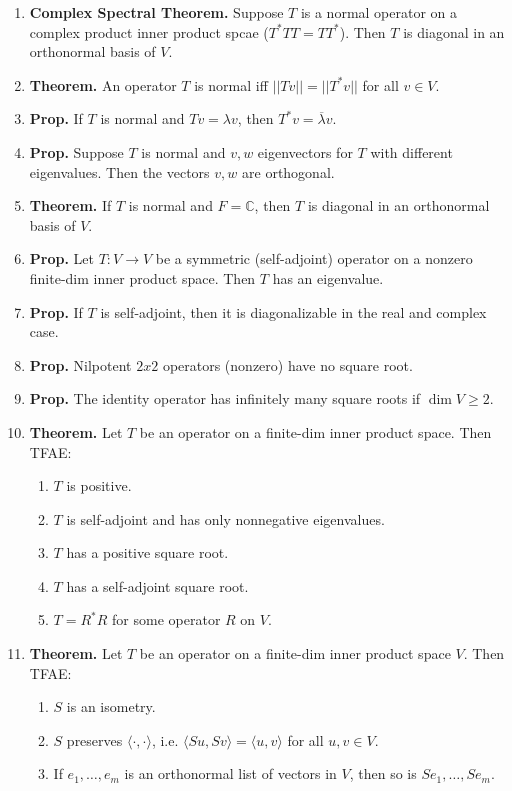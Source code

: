 \begin{enumerate}
	\item \textbf{Complex Spectral Theorem. } Suppose $T$ is a normal operator on a complex product inner product spcae ($T^*TT = TT^*$). Then $T$ is diagonal in an orthonormal basis of $V$. 
	\item \textbf{Theorem. } An operator $T$ is normal iff $||Tv|| = ||T^*v||$ for all $v \in V$. 
	\item \textbf{Prop. } If $T$ is normal and $Tv = \lambda v$, then $T^*v = \overline{\lambda}v$. 
	\item \textbf{Prop. } Suppose $T$ is normal and $v,w$ eigenvectors for $T$ with different eigenvalues. Then the vectors $v,w$ are orthogonal. 
	\item \textbf{Theorem. } If $T$ is normal and $F = \mathbb{C}$, then $T$ is diagonal in an orthonormal basis of $V$. 
	\item \textbf{Prop. } Let $T: V \to V$ be a symmetric (self-adjoint) operator on a nonzero finite-dim inner product space. Then $T$ has an eigenvalue. 
	\item \textbf{Prop. } If $T$ is self-adjoint, then it is diagonalizable in the real and complex case. 
	\item \textbf{Prop. } Nilpotent $2x2$ operators (nonzero) have no square root. 
	\item \textbf{Prop. } The identity operator has infinitely many square roots if $\dim V \geq 2$. 
	\item \textbf{Theorem. } Let $T$ be an operator on a finite-dim inner product space. Then TFAE: 
	\begin{enumerate}
		\item $T$ is positive. 
		\item $T$ is self-adjoint and has only nonnegative eigenvalues. 
		\item $T$ has a positive square root. 
		\item $T$ has a self-adjoint square root. 
		\item $T = R^*R$ for some operator $R$ on $V$. 
	\end{enumerate}
	\item \textbf{Theorem. } Let $T$ be an operator on a finite-dim inner product space $V$. Then TFAE: 
	\begin{enumerate}
		\item $S$ is an isometry. 
		\item $S$ preserves $\langle \cdot, \cdot \rangle$, i.e. $\langle Su,Sv \rangle = \langle u,v \rangle$ for all $u,v \in V$. 
		\item If $e_1,\dots,e_m$ is an orthonormal list of vectors in $V$, then so is $Se_1,\dots,Se_m$. 

\end{enumerate}
\end{enumerate}
